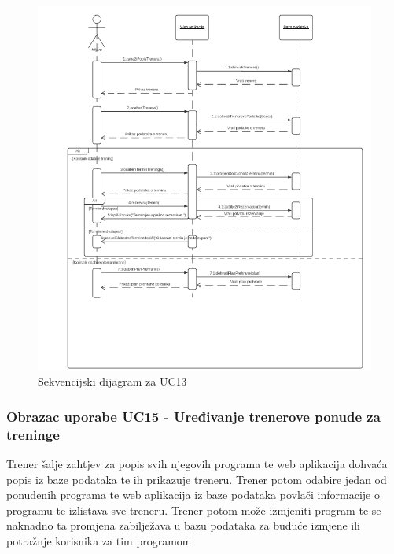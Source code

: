                     \begin{figure}[H]
			            \includegraphics[scale=0.9]{slike/UC13.PNG} %
			            \centering
			            \caption{Sekvencijski dijagram za UC13}
			            \label{fig:promjene}
		            \end{figure}
                    
                    
                    \subsubsection{Obrazac uporabe UC15 - Uređivanje trenerove ponude za treninge}
					\textit{}Trener šalje zahtjev za popis svih njegovih programa te web aplikacija dohvaća popis
                    iz baze podataka te ih prikazuje treneru. Trener potom odabire jedan od ponuđenih programa
                    te web aplikacija iz baze podataka povlači informacije o programu te izlistava sve treneru.
                    Trener potom može izmjeniti program te se naknadno ta promjena zabilježava u bazu podataka
                    za buduće izmjene ili potražnje korisnika za tim programom.\\
                    
